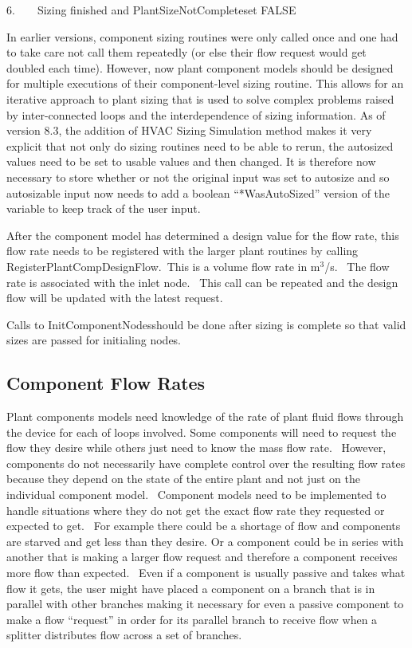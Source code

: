 6.~~~~Sizing finished and PlantSizeNotCompleteset FALSE

In earlier versions, component sizing routines were only called once and one had to take care not call them repeatedly (or else their flow request would get doubled each time). However, now plant component models should be designed for multiple executions of their component-level sizing routine. This allows for an iterative approach to plant sizing that is used to solve complex problems raised by inter-connected loops and the interdependence of sizing information. As of version 8.3, the addition of HVAC Sizing Simulation method makes it very explicit that not only do sizing routines need to be able to rerun, the autosized values need to be set to usable values and then changed. It is therefore now necessary to store whether or not the original input was set to autosize and so autosizable input now needs to add a boolean ``*WasAutoSized'' version of the variable to keep track of the user input.

After the component model has determined a design value for the flow rate, this flow rate needs to be registered with the larger plant routines by calling RegisterPlantCompDesignFlow.~This is a volume flow rate in m\(^{3}\)/s.~ The flow rate is associated with the inlet node.~ This call can be repeated and the design flow will be updated with the latest request.

Calls to InitComponentNodesshould be done after sizing is complete so that valid sizes are passed for initialing nodes.

\subsection{Component Flow Rates}\label{component-flow-rates}

Plant components models need knowledge of the rate of plant fluid flows through the device for each of loops involved. Some components will need to request the flow they desire while others just need to know the mass flow rate.~ However, components do not necessarily have complete control over the resulting flow rates because they depend on the state of the entire plant and not just on the individual component model.~ Component models need to be implemented to handle situations where they do not get the exact flow rate they requested or expected to get.~ For example there could be a shortage of flow and components are starved and get less than they desire. Or a component could be in series with another that is making a larger flow request and therefore a component receives more flow than expected.~ Even if a component is usually passive and takes what flow it gets, the user might have placed a component on a branch that is in parallel with other branches making it necessary for even a passive component to make a flow ``request'' in order for its parallel branch to receive flow when a splitter distributes flow across a set of branches.

